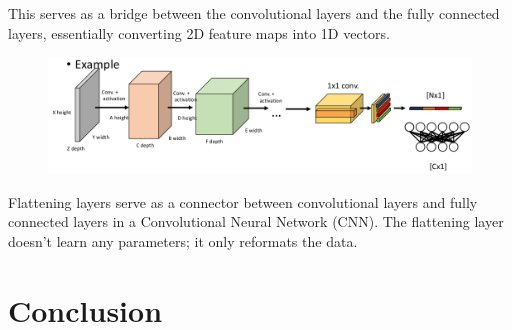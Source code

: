\documentclass[11pt]{article}
\begin{document}
This serves as a bridge between the convolutional layers and the fully connected layers, essentially converting 2D feature maps into 1D vectors.

\begin{figure}[H]
    \centering
    \includegraphics[width=\linewidth]{figures/flattening.png}
\end{figure}

Flattening layers serve as a connector between convolutional layers and fully connected layers in a Convolutional Neural Network (CNN). The flattening layer doesn't learn any parameters; it only reformats the data.

\section{Conclusion}
\end{document}
